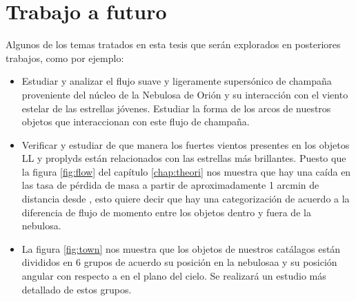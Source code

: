 \section{Trabajo a futuro}
\label{sec:future}

Algunos de los temas tratados en esta tesis que  serán explorados en posteriores trabajos, como por ejemplo:

\begin{itemize}
\item Estudiar y analizar el flujo suave y ligeramente supersónico de champaña proveniente del núcleo de la Nebulosa de Orión y su interacción con el viento estelar de las estrellas jóvenes. Estudiar la forma de los arcos de nuestros objetos que interaccionan con este flujo de champaña.
\item Verificar y estudiar de que manera los fuertes vientos presentes en los objetos LL y proplyds están relacionados con las estrellas más brillantes. Puesto que la figura \ref{fig:flow} del capítulo \ref{chap:theori}  nos muestra que hay una caída  en las tasa de pérdida de masa a partir de aproximadamente 1 arcmin de distancia desde \thC{}, esto quiere decir que hay una categorización de acuerdo a la diferencia de flujo de momento entre los objetos dentro y fuera de la nebulosa.   
\item La figura \ref{fig:town} nos muestra que los objetos de nuestros catálagos están divididos en 6 grupos de acuerdo su posición en la nebulosaa y su posición angular con respecto a \thC{} en el plano del cielo. Se realizará un estudio más detallado de estos grupos.
\end{itemize} 

%